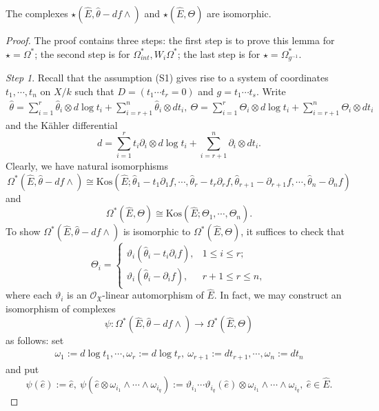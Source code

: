 \documentclass[10pt,a4paper]{amsart}
\begin{document}
\begin{lemma}
The complexes $\star(\hat E,\hat\theta-df\wedge)$ and $\star(\hat E,\Theta)$ are isomorphic.   
\end{lemma}

\begin{proof}
The proof contains three steps: the first step is to prove this lemma for $\star=\Omega^*$; the second step is for $\Omega^*_{int},W_i\Omega^*$; the last step is for $\star=\Omega^*_{g^{-1}}$.

\emph{Step 1}. Recall that the assumption (S1) gives rise to a system of coordinates $t_1,\cdots,t_n$ on $X/k$ such that $D=(t_1\cdots t_r=0)$ and $g=t_1\cdots t_s$. Write
\begin{eqnarray}\label{Theta cor}
\hat\theta=\sum_{i=1}^r\hat\theta_i\otimes d\log t_i+\sum_{i=r+1}^n\hat\theta_i\otimes dt_i,~\Theta=\sum_{i=1}^r\Theta_i\otimes d\log t_i+\sum_{i=r+1}^n\Theta_i\otimes dt_i
\end{eqnarray}
and the K\"ahler differential 
$$d=\sum_{i=1}^rt_i\partial_i\otimes d\log t_i+\sum_{i=r+1}^n\partial_i\otimes dt_i.$$ 
Clearly, we have natural isomorphisms
$$
\Omega^*(\hat E,\hat\theta-df\wedge)\cong\mathrm{Kos}(\hat E;\hat\theta_1-t_1\partial_1f,\cdots,\hat\theta_r-t_r\partial_rf,\hat\theta_{r+1}-\partial_{r+1}f,\cdots,\hat\theta_n-\partial_nf)
$$
and
$$
\Omega^*(\hat E,\Theta)\cong\mathrm{Kos}(\hat E;\Theta_1,\cdots,\Theta_n).
$$
To show $\Omega^*(\hat E,\hat\theta-df\wedge)$ is isomorphic to $\Omega^*(\hat E,\Theta)$, it suffices to check that 
$$
\Theta_i=\left\{
\begin{matrix}
  \vartheta_i(\hat\theta_i-t_i\partial_if),&1\leq i\leq r;\\
\vartheta_i(\hat\theta_i-\partial_if),&r+1\leq r\leq n,
\end{matrix}
\right.
$$
where each $\vartheta_i$ is an $\mathcal O_{\mathfrak X}$-linear automorphism of $\hat E$. In fact, we may construct an isomorphism of complexes 
$$
\psi:\Omega^*(\hat E,\hat\theta-df\wedge)\to\Omega^*(\hat E,\Theta) 
$$
as follows: set 
\begin{eqnarray}\label{omega}
\omega_1:=d\log t_1,\cdots,\omega_r:=d\log t_r,~\omega_{r+1}:=dt_{r+1},\cdots,\omega_n:=dt_n
\end{eqnarray}
and put
$$
\psi(\hat e):=\hat e,~\psi(\hat e\otimes\omega_{i_1}\wedge\cdots\wedge\omega_{i_q}):=\vartheta_{i_1}\cdots\vartheta_{i_q}(\hat e)\otimes\omega_{i_1}\wedge\cdots\wedge\omega_{i_q},~\hat e\in\hat E.
$$


\end{proof}
\end{document}
